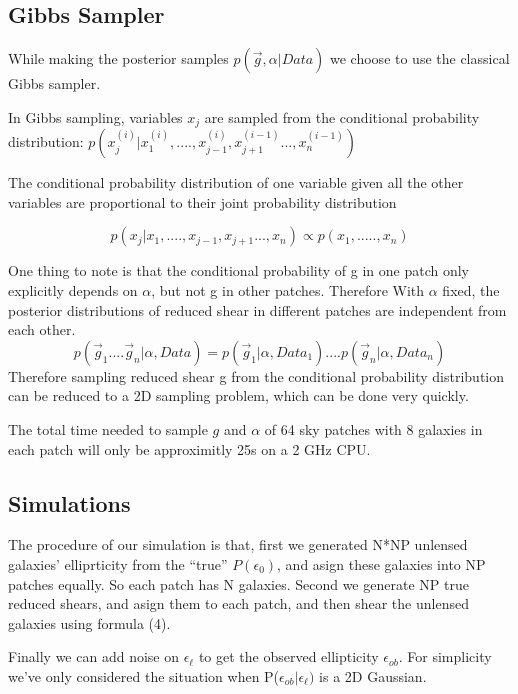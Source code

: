 \documentclass[useAMS,usenatbib]{mn2e}
\begin{document}
\subsection{Gibbs Sampler}

While making the posterior samples $p(\vec{g},\alpha|Data)$ we choose to
use the classical Gibbs sampler.

In Gibbs sampling, variables $x_{j}$ are sampled from the conditional
probability distribution: $p(x_{j}^{(i)}|x_{1}^{(i)},....,x_{j-1}^{(i)},x_{j+1}^{(i-1)}...,x_{n}^{(i-1)})$

The conditional probability distribution of one variable given all the other variables are proportional to their joint probability distribution

\begin{equation}
p(x_{j}|x_{1},....,x_{j-1},x_{j+1}...,x_{n})\propto p(x_{1},.....,x_{n})
\end{equation}


One thing to note is that the conditional probability of g in one patch only explicitly depends on $\alpha$, but not g in other patches. Therefore
With $\alpha$ fixed, the posterior distributions of reduced shear in different patches are independent from each other. 
\begin{equation}
p(\vec{g}_{1}....\vec{g}_{n}|\alpha,Data)=p(\vec{g}_{1}|\alpha,Data_{1})....p(\vec{g}_{n}|\alpha,Data_{n})
\end{equation}
Therefore sampling reduced shear g from the conditional probability distribution can be reduced to a 2D sampling problem, which can be done very quickly.

The total time needed to sample $g$ and $\alpha$ of 64 sky patches with 8 galaxies in each patch will only be 
approximitly 25s on a 2 GHz CPU.


\subsection{Simulations}

The procedure of our simulation is that, first we generated N{*}NP
unlensed galaxies' elliprticity from the ``true'' $P(\epsilon_{0})$, and
asign these galaxies into NP patches equally. So each patch has N galaxies. Second
we generate NP true reduced shears, and asign them to each patch, and
then shear the unlensed galaxies using formula (4).

Finally we can add noise on $\epsilon_{\ell}$ to get the
observed ellipticity $\epsilon_{ob}$. For simplicity we've only considered
the situation when P($\epsilon_{ob}|\epsilon_{\ell})$ is a 2D Gaussian.
\end{document}
